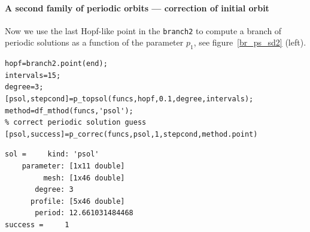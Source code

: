\documentclass[10pt]{scrartcl}
\newcommand{\blist}[1]{\mbox{\lstinline!#1!}}
\begin{document}
\paragraph{A second family of periodic orbits --- correction of initial orbit}
Now we use the last Hopf-like point in the \blist{branch2} 
to compute a branch of periodic solutions as a function of 
the parameter $p_1$, see figure~\ref{br_ps_sd2} (left).
\begin{lstlisting}
hopf=branch2.point(end);
intervals=15;
degree=3;
[psol,stepcond]=p_topsol(funcs,hopf,0.1,degree,intervals);
method=df_mthod(funcs,'psol');
% correct periodic solution guess
[psol,success]=p_correc(funcs,psol,1,stepcond,method.point)  
\end{lstlisting}
{\small
\begin{verbatim}
sol =     kind: 'psol'
    parameter: [1x11 double]
         mesh: [1x46 double]
       degree: 3
      profile: [5x46 double]
       period: 12.661031484468
success =     1
\end{verbatim}}
\end{document}
